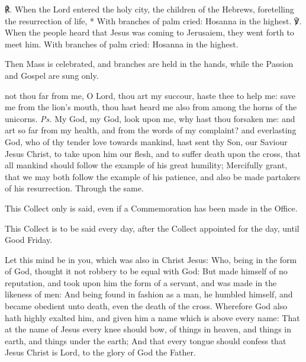 ℟. When the Lord entered the holy city, the children of the Hebrews, foretelling the resurrection of life, * With branches of palm cried: Hosanna in the highest. ℣. When the people heard that Jesus was coming to Jerusaiem, they went forth to meet him. With branches of palm cried: Hosanna in the highest.
\begin{rubric}
    Then Mass is celebrated, and branches are held in the hands, while the Passion and Gospel are sung only.
\end{rubric}
\introit
{} not thou far from me, O Lord, thou art my succour, haste thee to help me: save me from the lion's mouth, thou hast heard me also from among the horns of the unicorns. \textit{Ps.} My God, my God, look upon me, why hast thou forsaken me: and art so far from my health, and from the words of my complaint? 
\collect
{} and everlasting God, who of thy tender love towards mankind, hast sent thy Son, our Saviour Jesus Christ, to take upon him our flesh, and to suffer death upon the cross, that all mankind should follow the example of his great humility; Mercifully grant, that we may both follow the example of his patience, and also be made partakers of his resurrection. Through the same.
\begin{rubric}
    This Collect only is said, even if a Commemoration has been made in the Office.
\end{rubric}
\begin{rubric}
    This Collect is to be said every day, after the Collect appointed for the day, until Good Friday.
\end{rubric}

\clearpage
{}
 Let this mind be in you, which was also in Christ Jesus: Who, being in the form of God, thought it not robbery to be equal with God: But made himself of no reputation, and took upon him the form of a servant, and was made in the likeness of men: And being found in fashion as a man, he humbled himself, and became obedient unto death, even the death of the cross. Wherefore God also hath highly exalted him, and given him a name which is above every name:  That at the name of Jesus every knee should bow, of things in heaven, and things in earth, and things under the earth; And that every tongue should confess that Jesus Christ is Lord, to the glory of God the Father.

